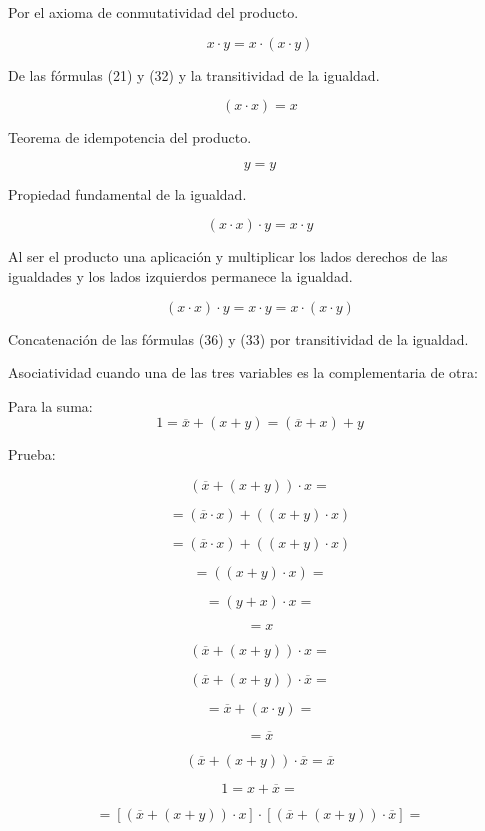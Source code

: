 Por el axioma de conmutatividad del producto.

\[{x \cdot y} = {x \cdot {({x \cdot y})}}\]

De las fórmulas (21) y (32) y la transitividad de la igualdad.

\[{\left( {x \cdot x} \right) = x}{}\]

Teorema de idempotencia del producto.

\[y = y\]

Propiedad fundamental de la igualdad.

\[{{({x \cdot x})} \cdot y} = {x \cdot y}\]

Al ser el producto una aplicación y multiplicar los lados derechos de
las igualdades y los lados izquierdos permanece la igualdad.

\[{}{{{{({x \cdot x})} \cdot y} = {x \cdot y}} = {x \cdot {({x \cdot y})}}}\]

Concatenación de las fórmulas (36) y (33) por transitividad de la
igualdad.

Asociatividad cuando una de las tres variables es la complementaria de
otra:

Para la
suma:\[{1 = {\overline{x} + {({x + y})}}} = {{({\overline{x} + x})} + y}\]

Prueba:

\[{{({\overline{x} + {({x + y})}})} \cdot x} = {}\]

\[= {{({\overline{x} \cdot x})} + {({{({x + y})} \cdot x})}}\]

\[= {{({\overline{x} \cdot x})} + {({{({x + y})} \cdot x})}}\]

\[{= {({{({x + y})} \cdot x})}} =\]

\[{= {{({y + x})} \cdot x}} =\]

\[= x\]

\[{{({\overline{x} + {({x + y})}})} \cdot x} = {}\]

\[{{({\overline{x} + {({x + y})}})} \cdot \overline{x}} = {}\]

\[{= {\overline{x} + {({x \cdot y})}}} = {}\]

\[= \overline{x}\]

\[{{{({\overline{x} + {({x + y})}})} \cdot \overline{x}} = \overline{x}}{}\]

\[{1 = {x + \overline{x}}} = {}\]

\[{= {\left\lbrack {\left( {\overline{x} + \left( {x + y} \right)} \right) \cdot x} \right\rbrack \cdot \left\lbrack {\left( {\overline{x} + \left( {x + y} \right)} \right) \cdot \overline{x}} \right\rbrack}} =\]


